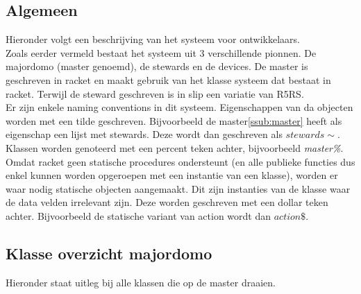 \documentclass{article}
\begin{document}
\subsection{Algemeen}
\label{sub:intro}
Hieronder volgt een beschrijving van het systeem voor ontwikkelaars. \\
Zoals eerder vermeld bestaat het systeem uit 3 verschillende pionnen. De majordomo (master genoemd), de stewards en de devices. De master is geschreven in racket en maakt gebruik van het klasse systeem dat bestaat in racket. Terwijl de steward geschreven is in slip een variatie van R5RS.\\
Er zijn enkele naming conventions in dit systeem. Eigenschappen van da objecten worden met een tilde geschreven. Bijvoorbeeld de master\ref{ssub:master} heeft als eigenschap een lijst met stewards. Deze wordt dan geschreven als $stewards\sim$.\\
Klassen worden genoteerd met een percent teken achter, bijvoorbeeld \emph{master\%}.\\
Omdat racket geen statische procedures ondersteunt (en alle publieke functies dus enkel kunnen worden opgeroepen met een instantie van een klasse), worden er waar nodig statische objecten aangemaakt. Dit zijn instanties van de klasse waar de data velden irrelevant zijn. Deze worden geschreven met een dollar teken achter. Bijvoorbeeld de statische variant van action wordt dan $action\$$.\\
\subsection{Klasse overzicht majordomo}
\label{sub:class}
Hieronder staat uitleg bij alle klassen die op de master draaien.
\end{document}
